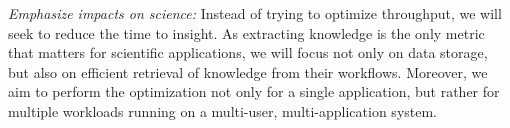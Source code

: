 \begin{tightItemize}
\item
{\em Emphasize impacts on science:}
Instead of trying to optimize throughput, we will seek to reduce the time to insight.
As extracting knowledge is the only metric that matters for scientific applications, we will
focus not only on data storage, but also on efficient retrieval of knowledge from their 
workflows.
Moreover, we aim to perform the optimization not only for a single
application, but rather for multiple workloads running on a multi-user, multi-application
system.
\end{tightItemize}

